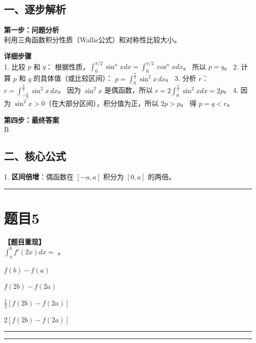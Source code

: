 \documentclass[12pt, a4paper]{ctexart}
\newcommand{\TopSeparator}{
    \par\noindent\rule{\textwidth}{1.5pt}\vspace{0.5em} %
}
\newcommand{\AnalysisSeparator}{
    \par\noindent\rule{\textwidth}{0.5pt}\vspace{0.2em}\hrule\vspace{0.5em} %
}
\newenvironment{RedAnalysis}{
    \par
    \color{red} %
}{
    \par
    \color{black} %
}
\newcommand{\choicesTwo}[4]{
    \begin{enumerate}[label=\Alph*., itemsep=0pt, parsep=0pt, topsep=5pt, labelsep=0.5em]
        \begin{minipage}{0.45\linewidth} \item #1 \end{minipage}
        \begin{minipage}{0.45\linewidth} \item #2 \end{minipage}
        \begin{minipage}{0.45\linewidth} \item #3 \end{minipage}
        \begin{minipage}{0.45\linewidth} \item #4 \end{minipage}
    \end{enumerate}
}
\begin{document}
\begin{RedAnalysis}

\subsection*{一、逐步解析}

\textbf{第一步：问题分析} \\
利用三角函数积分性质（Wallis公式）和对称性比较大小。

\textbf{详细步骤} \\
1. 比较 $p$ 和 $q$：
   根据性质，$\int_0^{\pi/2} \sin^n x dx = \int_0^{\pi/2} \cos^n x dx$。
   所以 $p = q$。
2. 计算 $p$ 和 $q$ 的具体值（或比较区间）：
   $p = \int_{0}^{\frac{\pi}{2}} \sin^{2}x \, dx$。
3. 分析 $r$：
   $r = \int_{-\frac{\pi}{2}}^{\frac{\pi}{2}} \sin^{2}x \, dx$。
   因为 $\sin^2 x$ 是偶函数，所以 $r = 2 \int_0^{\frac{\pi}{2}} \sin^2 x dx = 2p$。
4. 因为 $\sin^2 x > 0$（在大部分区间），积分值为正，所以 $2p > p$。
   得 $p = q < r$。

\textbf{第四步：最终答案} \\
B

\subsection*{二、核心公式}
1. \textbf{区间倍增}：偶函数在 $[-a, a]$ 积分为 $[0, a]$ 的两倍。

\end{RedAnalysis}

\vspace{2em}

\TopSeparator
\section*{题目5}

\textbf{【题目重现】} \\
$ \int_{a}^{b}f'(2x)dx= $ \underline{\hspace{1cm}}。
\choicesTwo
{$ f(b) - f(a) $}
{$ f(2b) - f(2a) $}
{$ \frac{1}{2}[f(2b)-f(2a)] $}
{$ 2[f(2b)-f(2a)] $}

\AnalysisSeparator
\end{document}
